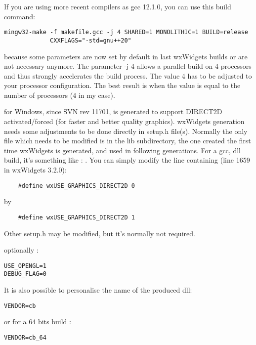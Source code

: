 If you are using more recent compilers as gcc 12.1.0, you can use this build command:
\begin{verbatim}
mingw32-make -f makefile.gcc -j 4 SHARED=1 MONOLITHIC=1 BUILD=release
             CXXFLAGS="-std=gnu++20"
\end{verbatim}
because some parameters are now set by default in last wxWidgets builds or are not necessary anymore.\newline
The parameter -j 4 allows a parallel build on 4 processors and thus strongly accelerates the build process. The value 4 has to be adjusted to your processor configuration.
The best result is when the value is equal to the number of processors (4 in my case).

\codeblocks for Windows, since SVN rev 11701, is generated to support DIRECT2D activated/forced (for faster and better quality graphics). wxWidgets generation needs some adjustments to be done directly in setup.h file(s). Normally the only file which needs to be modified is in the lib subdirectory, the one created the first time wxWidgets is generated, and used in following generations. For a gcc, dll build, it's something like : .\newline
You can simply modify the line containing (line 1659 in wxWidgets 3.2.0):
\begin{verbatim}
    #define wxUSE_GRAPHICS_DIRECT2D 0 
\end{verbatim}
by
\begin{verbatim}
    #define wxUSE_GRAPHICS_DIRECT2D 1  
\end{verbatim}
Other setup.h may be modified, but it's normally not required.

optionally :
\begin{verbatim}
USE_OPENGL=1
DEBUG_FLAG=0
\end{verbatim}


It is also possible to personalise the name of the produced dll:
\begin{verbatim}
VENDOR=cb
\end{verbatim}
or for a 64 bits build :
\begin{verbatim}
VENDOR=cb_64
\end{verbatim}


